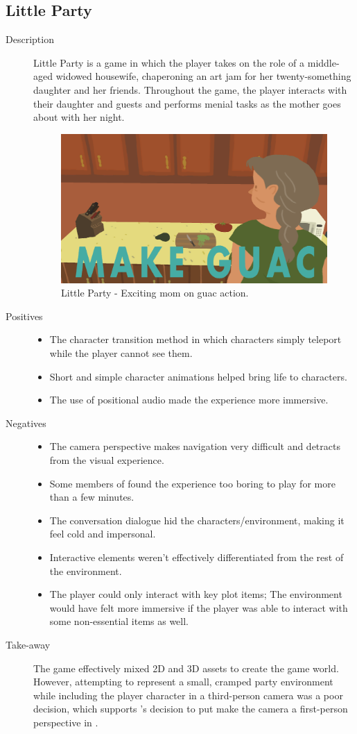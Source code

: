 \subsection{Little Party}
\begin{description}
\item[Description]{Little Party is a game in which the player takes on the role of a middle-aged widowed housewife, chaperoning an art jam for her twenty-something daughter and her friends. Throughout the game, the player interacts with their daughter and guests and performs menial tasks as the mother goes about with her night. 

\begin{figure}[htb]
	\centering\includegraphics[width=.25\linewidth]{images/game_little_party}
	\caption{Little Party - Exciting mom on guac action.}
	\label{fig:little_party}
\end{figure}}
\item[Positives]{
\begin{itemize}
\item{The character transition method in which characters simply teleport while the player cannot see them.}
\item{Short and simple character animations helped bring life to characters.}
\item{The use of positional audio made the experience more immersive.}
\end{itemize}
}
\item[Negatives]{
\begin{itemize}
\item{The camera perspective makes navigation very difficult and detracts from the visual experience.}
\item{Some members of \ourteam{} found the experience too boring to play for more than a few minutes.}
\item{The conversation dialogue hid the characters/environment, making it feel cold and impersonal.}
\item{Interactive elements weren't effectively differentiated from the rest of the environment.}
\item{The player could only interact with key plot items; The environment would have felt more immersive if the player was able to interact with some non-essential items as well.}
\end{itemize}
}
\item[Take-away]{The game effectively mixed 2D and 3D assets to create the game world. However, attempting to represent a small, cramped party environment while including the player character in a third-person camera was a poor decision, which supports \ourteam{}'s decision to put make the camera a first-person perspective in \ourgame{}.}
\end{description}



